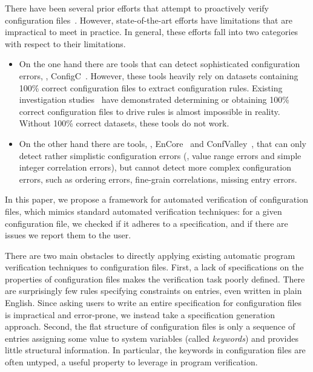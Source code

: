 There have been several prior efforts that attempt to proactively verify 
configuration files~\cite{santolucitoCAV, xu16early,
zhang14encore, huang15confvalley}.
However, state-of-the-art efforts have limitations that are impractical to meet in practice.
In general, these efforts fall into two categories with respect to their limitations.
\begin{itemize}
\item On the one hand there are tools that can detect sophisticated 
configuration errors, \eg, ConfigC~\cite{santolucitoCAV}. 
However, these tools heavily rely on datasets containing 100\% 
correct configuration files to extract configuration rules.
Existing investigation studies~\cite{wang04automatic, yin11anempirical}
have demonstrated determining or obtaining 100\% correct configuration
files to drive rules is almost impossible in reality. 
Without 100\% correct datasets, these tools do not work.
\item On the other hand there are tools, 
\eg, EnCore~\cite{zhang14encore} and
ConfValley~\cite{huang15confvalley}, that can only 
detect rather simplistic configuration errors (\eg, value range errors 
and simple integer correlation errors), but cannot detect
more complex configuration errors, such as ordering errors, fine-grain correlations, missing entry errors.
\end{itemize}

In this paper, we propose a framework for automated verification of 
configuration files, which mimics standard automated verification 
techniques: for a given configuration file, we  checked if it 
adheres to a specification, and if there are issues we report them to 
the user.

There are two main obstacles to directly applying existing automatic program
verification techniques to configuration files.
First, a lack of specifications on the properties of configuration files makes the verification task poorly defined.
There are surprisingly few rules specifying constraints on entries, even written in plain English.
Since asking users to write an entire specification for configuration files is impractical and error-prone, we instead take a specification generation approach.
Second, the flat structure of configuration files is only a sequence of entries assigning some value to system
variables (called {\emph {keywords}}) and provides little structural information.
In particular, the keywords in configuration files are often untyped, a useful property to leverage in program verification.

